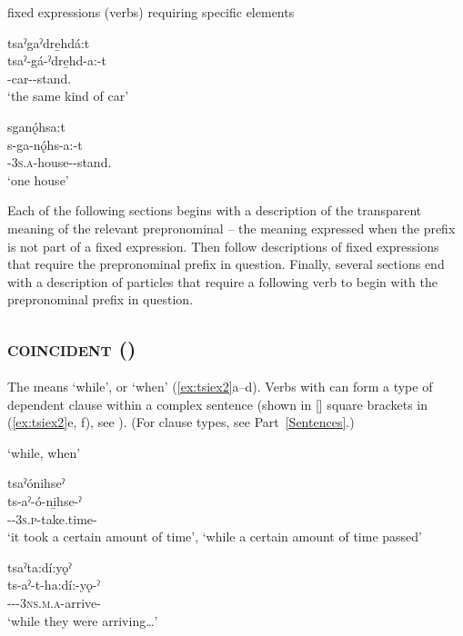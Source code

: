 \ea\label{ex:advlike100} fixed expressions (verbs) requiring specific elements

\ea tsaˀgaˀdre̱hdá:t\\\label{ex:advlike100a}
\gll tsaˀ-gá-ˀdre̱hd-a:-t\\
{\coincidentfactual}-car-{\joinerA}-stand.{\stative}\\
\glt `the same kind of car'

\ex sganǫ́hsa:t\\\label{ex:advlike100b}
\gll s-ga-nǫ́hs-a:-t\\
{\repetitive}-\textsc{3s.a}-house-{\joinerA}-stand.{\stative}\\
\glt `one house'
\z
\z  

Each of the following sections begins with a description of the transparent meaning of the relevant prepronominal -- the meaning expressed when the prefix is not part of a fixed expression. Then follow descriptions of fixed expressions that require the prepronominal prefix in question. Finally, several sections end with a description of particles that require a following verb to begin with the prepronominal prefix in question. 


\subsection{ \textsc{coincident} ({\coincident})} \label{[tsi-] (coincident) prefix}
The  \textsc{\coincident} means ‘while’, or ‘when’ (\ref{ex:tsiex2}a--d). Verbs with  can form a type of dependent clause  within a complex sentence (shown in [] square brackets in (\ref{ex:tsiex2}e, f), see ). (For clause types, see Part~\ref{Sentences}.)

\newpage
\ea\label{ex:tsiex2}  ‘while, when’

\ea tsaˀónihseˀ \\
\gll ts-aˀ-ó-ni̱hse-ˀ\\
{\coincident}-{\factual}-\textsc{3s.p}-take.time-{\punctual}\\
\glt ‘it took a certain amount of time’, `while a certain amount of time passed'

\ex tsaˀta:dí:yǫˀ\\
\gll ts-aˀ-t-ha:dí:-yǫ-ˀ\\
{\coincident}-{\factual}-{\cislocative}-\textsc{3ns.m.a}-arrive-{\punctual}\\
\glt ‘while they were arriving…’

